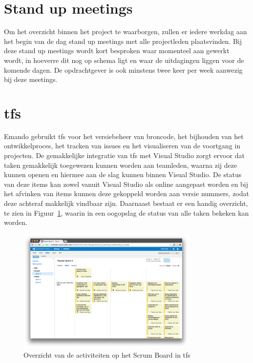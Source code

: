 \section{Stand up meetings}
Om het overzicht binnen het project te waarborgen, zullen er iedere werkdag aan het begin van de dag stand up meetings met alle projectleden plaatsvinden. Bij deze stand up meetings wordt kort besproken waar momenteel aan gewerkt wordt, in hoeverre dit nog op schema ligt en waar de uitdagingen liggen voor de komende dagen. De opdrachtgever is ook minstens twee keer per week aanwezig bij deze meetings.

\section{\acl{tfs}}
Emando gebruikt \ac{tfs} voor het versiebeheer van broncode, het bijhouden van het ontwikkelproces, het tracken van issues en het visualiseren van de voortgang in projecten. De gemakkelijke integratie van \ac{tfs} met Visual Studio zorgt ervoor dat taken gemakkelijk toegewezen kunnen worden aan teamleden, waarna zij deze kunnen openen en hiermee aan de slag kunnen binnen Visual Studio. De status van deze items kan zowel vanuit Visual Studio als online aangepast worden en bij het afvinken van items kunnen deze gekoppeld worden aan versie nummers, zodat deze achteraf makkelijk vindbaar zijn. Daarnaast bestaat er een handig overzicht, te zien in Figuur~\ref{fig:scrum-board}, waarin in een oogopslag de status van alle taken bekeken kan worden.

\begin{figure}[H]
  \begin{center}
    \includegraphics[width=0.8\textwidth]{style/images/screenshots/ScrumBoard}
  \end{center}
  \caption{Overzicht van de activiteiten op het Scrum Board in \ac{tfs}}
  \label{fig:scrum-board}
\end{figure}

